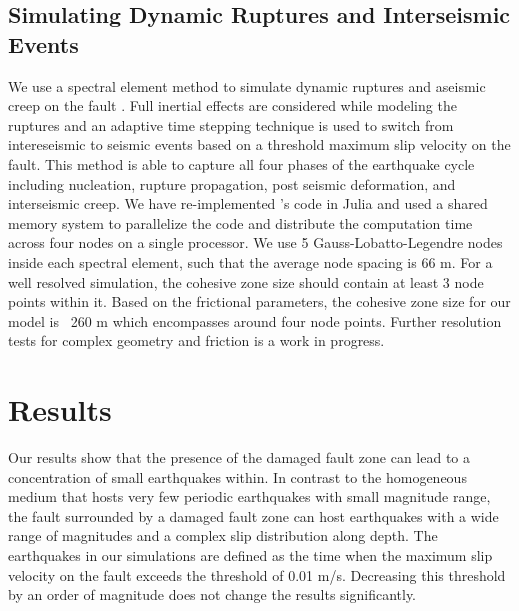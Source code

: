 \documentclass[11pt]{article}
\begin{document}
\subsection{Simulating Dynamic Ruptures and Interseismic Events}
We use a spectral element method to simulate dynamic ruptures and aseismic creep on the fault \citep{kaneko_2011}. Full inertial effects are considered while modeling the ruptures and an adaptive time stepping technique is used to switch from intereseismic to seismic events based on a threshold maximum slip velocity on the fault. This method is able to capture all four phases of the earthquake cycle including nucleation, rupture propagation, post seismic deformation, and interseismic creep.  We have re-implemented \citep{kaneko_2011}'s code in Julia \citep{bezanson_2017} and used a shared memory system to parallelize the code and distribute the computation time across four nodes on a single processor. We use 5 Gauss-Lobatto-Legendre nodes inside each spectral element, such that the average node spacing is 66 m. For a well resolved simulation, the cohesive zone size \citep{rubin_ampuero_2005,kaneko_2011} should contain at least 3 node points within it. Based on the frictional parameters, the cohesive zone size for our model is ~260 m which encompasses around four node points. Further resolution tests for complex geometry and friction is a work in progress.

\section{Results}
Our results show that the presence of the damaged fault zone can lead to a concentration of small earthquakes within. In contrast to the homogeneous medium that hosts very few periodic earthquakes with small magnitude range, the fault surrounded by a damaged fault zone can host earthquakes with a wide range of magnitudes and a complex slip distribution along depth. The earthquakes in our simulations are defined as the time when the maximum slip velocity on the fault exceeds the threshold of 0.01 m/s. Decreasing this threshold by an order of magnitude does not change the results significantly.
\end{document}
